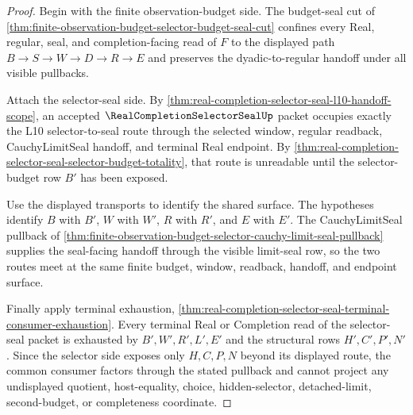 \begin{proof}
Begin with the finite observation-budget side. The budget-seal cut of \autoref{thm:finite-observation-budget-selector-budget-seal-cut} confines every Real, regular, seal, and completion-facing read of $F$ to the displayed path $B \to S \to W \to D \to R \to E$ and preserves the dyadic-to-regular handoff under all visible pullbacks.

Attach the selector-seal side. By \autoref{thm:real-completion-selector-seal-l10-handoff-scope}, an accepted $\RealCompletionSelectorSealUp$ packet occupies exactly the L10 selector-to-seal route through the selected window, regular readback, CauchyLimitSeal handoff, and terminal Real endpoint. By \autoref{thm:real-completion-selector-seal-selector-budget-totality}, that route is unreadable until the selector-budget row $B'$ has been exposed.

Use the displayed transports to identify the shared surface. The hypotheses identify $B$ with $B'$, $W$ with $W'$, $R$ with $R'$, and $E$ with $E'$. The CauchyLimitSeal pullback of \autoref{thm:finite-observation-budget-selector-cauchy-limit-seal-pullback} supplies the seal-facing handoff through the visible limit-seal row, so the two routes meet at the same finite budget, window, readback, handoff, and endpoint surface.

Finally apply terminal exhaustion, \autoref{thm:real-completion-selector-seal-terminal-consumer-exhaustion}. Every terminal Real or Completion read of the selector-seal packet is exhausted by $B',W',R',L',E'$ and the structural rows $H',C',P',N'$. Since the selector side exposes only $H,C,P,N$ beyond its displayed route, the common consumer factors through the stated pullback and cannot project any undisplayed quotient, host-equality, choice, hidden-selector, detached-limit, second-budget, or completeness coordinate.
\end{proof}

